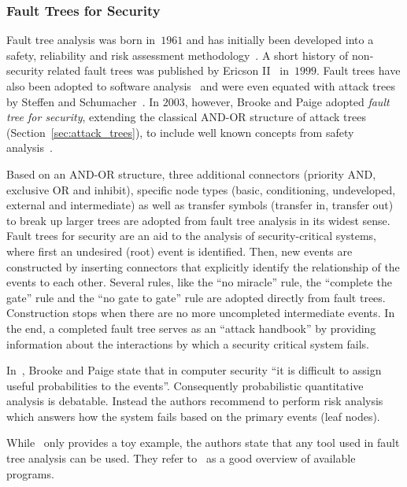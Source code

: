 \documentclass[a4paper]{article}
\begin{document}
\subsubsection{Fault Trees for Security} 
\label{sec:fault_trees_for_sec}

Fault tree analysis was born in~$1961$ and has initially been developed into a
safety, reliability and risk assessment
methodology~\cite{Wats,VeGoRoHa,StVeDuFrMiRa,Elec2}. A short history of
non-security related fault trees was published by Ericson II~\cite{Eric}
in~$1999$. Fault trees have also been adopted to software
analysis~\cite{LeHa,Leve,HeWoSlHoMiLu,HeWoSlHoMiWaWaSt} and were even equated
with attack trees by Steffen and Schumacher~\cite{StSc}. In $2003$, however,
Brooke and Paige adopted \emph{fault tree for security}, extending the classical
AND-OR structure of attack trees (Section~\ref{sec:attack_trees}), to include
well known concepts from safety analysis~\cite{BrPa}.

Based on an AND-OR structure, three additional connectors (priority AND,
exclusive OR and inhibit), specific node types (basic, conditioning,
undeveloped, external and intermediate) as well as transfer symbols (transfer
in, transfer out) to break up larger trees are adopted from fault tree
analysis in its widest sense. Fault trees for security are an aid to the
analysis of security-critical systems, where first an undesired (root) event is
identified. Then, new events are constructed by inserting connectors that
explicitly identify the relationship of the events to each other. Several
rules, like the ``no miracle'' rule, the ``complete the gate'' rule and the
``no gate to gate'' rule are adopted directly from fault trees. Construction
stops when there are no more uncompleted intermediate events. In the end, a
completed fault tree serves as an ``attack handbook'' by providing information
about the interactions by which a security critical system fails.

In~\cite{BrPa}, Brooke and Paige state that in computer security ``it is
difficult to assign useful probabilities to the events''. Consequently
probabilistic quantitative analysis is debatable. Instead the authors
recommend to perform risk analysis which answers how the system fails based on
the primary events (leaf nodes).

While~\cite{BrPa} only provides a toy example, the authors state that any tool
used in fault tree analysis can be used. They refer to~\cite{Website_FTAP} as
a good overview of available programs.
\end{document}
